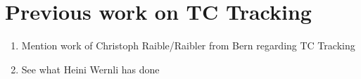 \section{Previous work on TC Tracking}\label{sec:tracking}
\begin{enumerate}
	\item Mention work of Christoph Raible/Raibler from Bern regarding TC Tracking
	\item See what Heini Wernli has done
\end{enumerate}